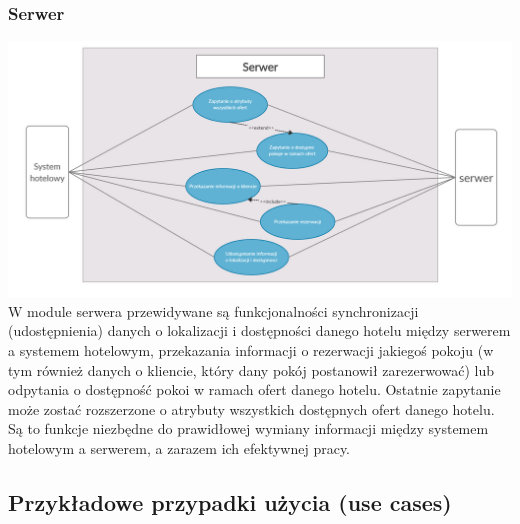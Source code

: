 \documentclass{article}
\begin{document}
\subsubsection{Serwer}
\includegraphics[width=\linewidth]{checkpoint1/Use cases - serwer.png}
\indent W module serwera przewidywane są funkcjonalności synchronizacji (udostępnienia) danych o lokalizacji i dostępności danego hotelu między serwerem a systemem hotelowym, przekazania infor\-macji o rezerwacji jakiegoś pokoju (w tym również danych o kliencie, który dany pokój postanowił zare\-zerwować) lub odpytania o dostępność pokoi w ramach ofert danego hotelu. Ostatnie zapytanie może zostać rozszerzone o atrybuty wszystkich dostępnych ofert danego hotelu. Są to funkcje niezbędne do prawidłowej wymiany informacji między systemem hotelowym a serwerem, a zarazem ich efektywnej pracy.



\subsection{Przykładowe przypadki użycia (use cases)}
\end{document}
